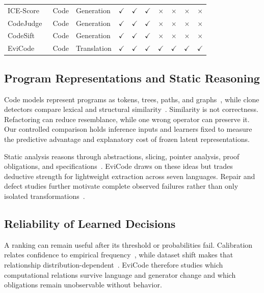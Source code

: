 \documentclass[conference]{IEEEtran}
\begin{document}
\begin{table}[t]
\begin{tabular}{@{}lllccccccc@{}}
ICE-Score~\cite{zhuo2024icescore} & Code & Generation & $\checkmark$ & $\checkmark$ & $\checkmark$ & $\times$ & $\times$ & $\times$ & $\times$ \\
CodeJudge~\cite{tong2024codejudge} & Code & Generation & $\checkmark$ & $\checkmark$ & $\checkmark$ & $\times$ & $\times$ & $\times$ & $\times$ \\
CodeSift~\cite{aggarwal2024codesift} & Code & Generation & $\checkmark$ & $\checkmark$ & $\checkmark$ & $\times$ & $\times$ & $\times$ & $\times$ \\
EviCode & Code & Translation & $\checkmark$ & $\checkmark$ & $\checkmark$ & $\checkmark$ & $\checkmark$ & $\checkmark$ & $\checkmark$ \\
\bottomrule
\end{tabular}
\end{table}

\subsection{Program Representations and Static Reasoning}
Code models represent programs as tokens, trees, paths, and graphs~\cite{allamanis2018survey,mou2016tbcnn,alon2019code2vec,feng2020codebert,guo2021graphcodebert,wang2021codet5,guo2022unixcoder,lu2021codexglue}, while clone detectors compare lexical and structural similarity~\cite{sajnani2016sourcerercc,jiang2007deckard,roy2009comparison}. Similarity is not correctness. Refactoring can reduce resemblance, while one wrong operator can preserve it. Our controlled comparison holds inference inputs and learners fixed to measure the predictive advantage and explanatory cost of frozen latent representations.

Static analysis reasons through abstractions, slicing, pointer analysis, proof obligations, and specifications~\cite{cousot1977abstract,tip1995slicing,hind2001pointer,necula1997proof,leino2010dafny}. EviCode draws on these ideas but trades deductive strength for lightweight extraction across seven languages. Repair and defect studies further motivate complete observed failures rather than only isolated transformations~\cite{legoues2012genprog,just2014defects4j,tufano2019empirical,gazzola2019automatic,monperrus2018automatic}.

\subsection{Reliability of Learned Decisions}
A ranking can remain useful after its threshold or probabilities fail. Calibration relates confidence to empirical frequency~\cite{guo2017calibration}, while dataset shift makes that relationship distribution-dependent~\cite{quinonero2008datasetshift,ovadia2019uncertainty}. EviCode therefore studies which computational relations survive language and generator change and which obligations remain unobservable without behavior.
\end{document}
